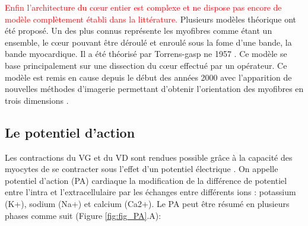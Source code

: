 \textcolor{red}{Enfin l’architecture du cœur entier est complexe et ne dispose pas encore de modèle complètement établi dans la littérature.} Plusieurs modèles théorique ont été proposé. Un des plus connus représente les myofibres comme étant un ensemble, le cœur pouvant être déroulé et enroulé sous la fome d’une bande, la bande myocardique. Il a été théorisé par Torrens-gasp ne 1957 \cite{Kocica2006}. Ce modèle se base principalement sur une dissection du cœur effectué par un opérateur. Ce modèle est remis en cause depuis le début des années 2000 avec l’apparition de nouvelles méthodes d’imagerie permettant d’obtenir l’orientation des myofibres en trois dimensions \cite{MacIver2017_end_I} \cite{MacIver2017_end_II}. \\  %

\subsection{Le potentiel d'action}



Les contractions du VG et du VD sont rendues possible grâce à la capacité des myocytes de se contracter sous l’effet d’un potentiel électrique \cite{renard:tel-04344684}. On appelle potentiel d’action (PA) cardiaque la modification de la différence de potentiel entre l’intra et l’extracellulaire par les échanges entre différents ions : potassium (K+), sodium (Na+) et calcium (Ca2+). Le PA peut être résumé en plusieurs phases comme suit  (Figure \ref{fig:fig_PA}.A): 

